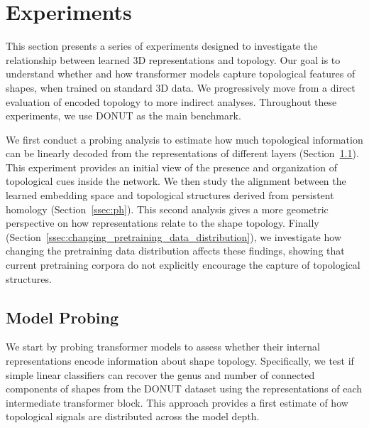 \section{Experiments}
\label{sec:experiments}

This section presents a series of experiments designed to investigate the relationship between learned 3D representations and topology. Our goal is to understand whether and how transformer models capture topological features of shapes, when trained on standard 3D data. We progressively move from a direct evaluation of encoded topology to more indirect analyses. Throughout these experiments, we use DONUT as the main benchmark.

We first conduct a probing analysis to estimate how much topological information can be linearly decoded from the representations of different layers (Section~\ref{ssec:model_probing}). This experiment provides an initial view of the presence and organization of topological cues inside the network. We then study the alignment between the learned embedding space and topological structures derived from persistent homology (Section~\ref{ssec:ph}). This second analysis gives a more geometric perspective on how representations relate to the shape topology. Finally (Section~\ref{ssec:changing_pretraining_data_distribution}), we investigate how changing the pretraining data distribution affects these findings, showing that current pretraining corpora do not explicitly encourage the capture of topological structures.

\subsection{Model Probing}
\label{ssec:model_probing}

We start by probing transformer models to assess whether their internal representations encode information about shape topology. Specifically, we test if simple linear classifiers can recover the genus and number of connected components of shapes from the DONUT dataset using the representations of each intermediate transformer block. This approach provides a first estimate of how topological signals are distributed across the model depth.

